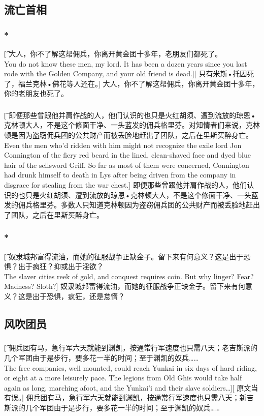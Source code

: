 \documentclass[12pt,a4paper]{article}
\begin{document}
\subsection{流亡首相}
\subsubsection{\color{red}*}\t[
	大人，你不了解这帮佣兵，你离开黄金团十多年，老朋友们都死了。\\
	You do not know these men, my lord. It has been a dozen years since you last rode with the Golden Company, and your old friend is dead.][
	只有米斯•托因死了，福兰克林•佛花等人还在。]
	大人，你不了解这帮佣兵，你离开黄金团十多年，你的老朋友也死了。
	
\subsubsection{}\t[	
	即便那些曾跟他并肩作战的人，他们认识的也只是火红胡须、遭到流放的琼恩•克林顿大人，不是这个修面干净、一头蓝发的佣兵格里芬。对知情者们来说，克林顿是因为盗窃佣兵团的公共财产而被丢脸地赶出了团队，之后在里斯买醉身亡。\\
	Even the men who'd ridden with him might not recognize the exile lord Jon Connington of the fiery red beard in the lined, clean-shaved face and dyed blue hair of the sellsword Griff. So far as most of them were concerned, Connington had drunk himself to death in Lys after being driven from the company in disgrace for stealing from the war chest.]
	即便那些曾跟他并肩作战的人，他们认识的也只是火红胡须、遭到流放的琼恩•克林顿大人，不是这个修面干净、一头蓝发的佣兵格里芬。多数人只知道克林顿因为盗窃佣兵团的公共财产而被丢脸地赶出了团队，之后在里斯买醉身亡。

\subsubsection{\color{red}*}\t[	
	奴隶城邦富得流油，而她的征服战争正缺金子。留下来有何意义？这是出于恐惧？出于疯狂？抑或出于淫欲？\\
	The slaver cities reek of gold, and conquest requires coin. But why linger? Fear? Madness? Sloth?]
	奴隶城邦富得流油，而她的征服战争正缺金子。留下来有何意义？这是出于恐惧，疯狂，还是怠惰？
	
\subsection{风吹团员}
\subsubsection{}\t[
	佣兵团有马，急行军六天就能到渊凯，按通常行军速度也只需八天；老吉斯派的几个军团由于是步行，要多花一半的时间；至于渊凯的奴兵……\\
	The free companies, well mounted, could reach Yunkai in six days of hard riding, or eight at a more leisurely pace. The legions from Old Ghis would take half again as long, marching afoot, and the Yunkai'i and their slave soldiers\ldots ][
	原文当有误。]
	佣兵团有马，急行军六天就能到渊凯，按通常行军速度也只需八天；新吉斯派的几个军团由于是步行，要多花一半的时间；至于渊凯的奴兵……
	
\end{document}
